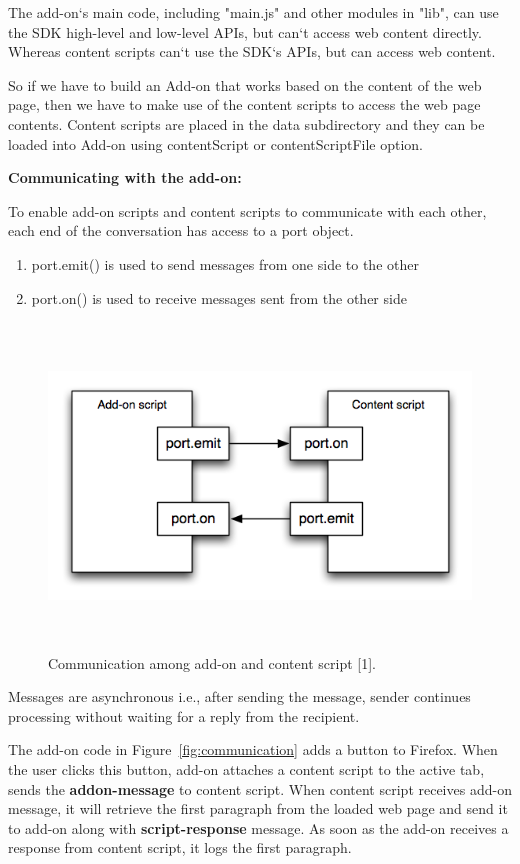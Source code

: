 The add-on`s main code, including "main.js" and other modules in "lib", can use the SDK high-level and low-level APIs, but can`t access web content directly. Whereas content scripts can`t use the SDK`s APIs, but can access web content.

So if we have to build an Add-on that works based on the content of the web page, then we have to make use of the content scripts to access the web page contents. Content scripts are placed in the data subdirectory and they can be loaded into Add-on using contentScript or contentScriptFile option.

\textbf{Communicating with the add-on:}

To enable add-on scripts and content scripts to communicate with each other, each end of the conversation has access to a port object.
\begin{enumerate}
\item port.emit() is used to send messages from one side to the other 
\item port.on() is used to receive messages sent from the other side
\end{enumerate}

\begin{figure}
  \centering
      \includegraphics[width=16cm, height=8.65cm]{content-scripting-overview.png}
    \caption[Communication among add-on and content script]{Communication among add-on and content script [1].}
    \label{fig:content-scripting-overview}
\end{figure}

Messages are asynchronous i.e., after sending the message, sender continues processing without waiting for a reply from the recipient.

The add-on code in Figure~\ref{fig:communication} adds a button to Firefox. When the user clicks this button, add-on attaches a content script to the active tab, sends the \textbf{addon-message} to content script. When content script receives add-on message, it will retrieve the first paragraph from the loaded web page and send it to add-on along with \textbf{script-response} message. As soon as the add-on receives a response from content script, it logs the first paragraph.

